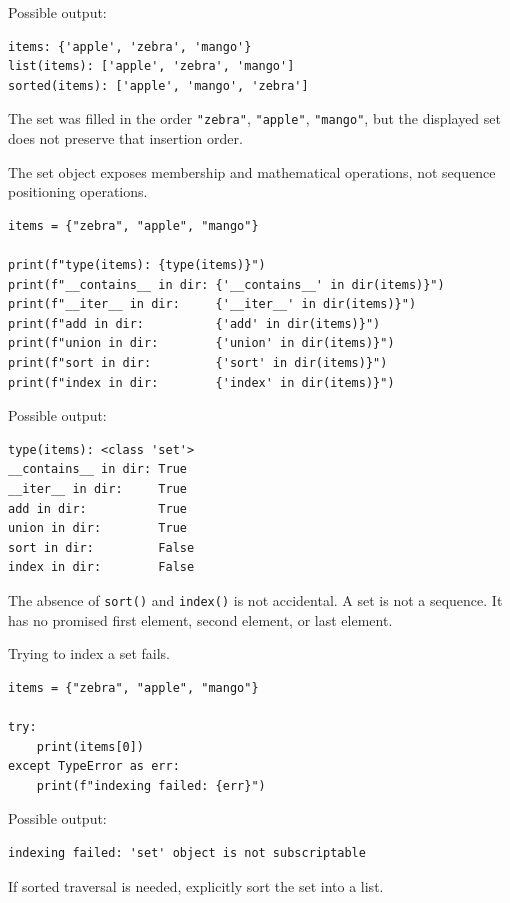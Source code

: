 Possible output:

\begin{verbatim}
items: {'apple', 'zebra', 'mango'}
list(items): ['apple', 'zebra', 'mango']
sorted(items): ['apple', 'mango', 'zebra']
\end{verbatim}

The set was filled in the order \texttt{"zebra"}, \texttt{"apple"}, \texttt{"mango"}, but the displayed set does not preserve that insertion order.

The set object exposes membership and mathematical operations, not sequence positioning operations.

\begin{verbatim}
items = {"zebra", "apple", "mango"}

print(f"type(items): {type(items)}")
print(f"__contains__ in dir: {'__contains__' in dir(items)}")
print(f"__iter__ in dir:     {'__iter__' in dir(items)}")
print(f"add in dir:          {'add' in dir(items)}")
print(f"union in dir:        {'union' in dir(items)}")
print(f"sort in dir:         {'sort' in dir(items)}")
print(f"index in dir:        {'index' in dir(items)}")
\end{verbatim}

Possible output:

\begin{verbatim}
type(items): <class 'set'>
__contains__ in dir: True
__iter__ in dir:     True
add in dir:          True
union in dir:        True
sort in dir:         False
index in dir:        False
\end{verbatim}

The absence of \texttt{sort()} and \texttt{index()} is not accidental. A set is not a sequence. It has no promised first element, second element, or last element.

Trying to index a set fails.

\begin{verbatim}
items = {"zebra", "apple", "mango"}

try:
    print(items[0])
except TypeError as err:
    print(f"indexing failed: {err}")
\end{verbatim}

Possible output:

\begin{verbatim}
indexing failed: 'set' object is not subscriptable
\end{verbatim}

If sorted traversal is needed, explicitly sort the set into a list.

